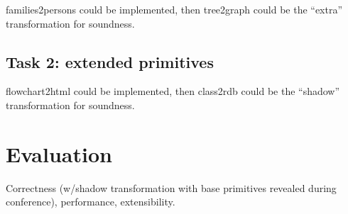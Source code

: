 \documentclass[a4paper]{scrartcl}
\begin{document}

families2persons could be implemented, then tree2graph could be the
``extra'' transformation for soundness.

\subsection{Task 2: extended primitives}
\label{sec:extprim}


flowchart2html could be implemented, then class2rdb could be the
``shadow'' transformation for soundness.

\section{Evaluation}
\label{sec:eval}

Correctness (w/shadow transformation with base primitives revealed
during conference), performance, extensibility.



\end{document}
